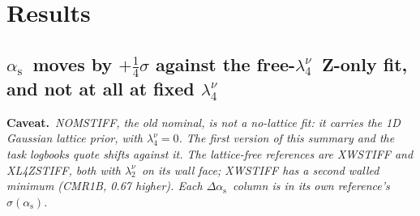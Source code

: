 \documentclass[10pt,a4paper]{article}
\newcommand\caveat[1]{{\color{sumwarn}\small\sffamily\textbf{Caveat.}}~{\small\itshape #1}}
\newcommand\alphas{\ensuremath{\alpha_\mathrm{s}}}
\newcommand\dalphas{\ensuremath{\Delta\alpha_\mathrm{s}}}
\newcommand\lnu[1]{\ensuremath{\lambda_{#1}^{\nu}}}
\newcommand\fit[1]{\textsf{#1}}
\begin{document}
\section{Results}

\subsection[alpha-s moves by +0.25 sigma against the free-lambda4 Z-only fit, and not at all at fixed lambda4]%
  {\alphas\ moves by $+\frac14\sigma$ against the free-\lnu4\ Z-only fit, and not at all at fixed \lnu4}

\caveat{\fit{NOMSTIFF}, the old nominal, is not a no-lattice fit: it carries the 1D Gaussian lattice prior, with $\lnu4=0$.
The first version of this summary and the task logbooks quote shifts against it. The lattice-free references are
\fit{XWSTIFF} and \fit{XL4ZSTIFF}, both with \lnu2\ on its wall face; \fit{XWSTIFF} has a second walled minimum
(\fit{CMR1B}, 0.67 higher). Each \dalphas\ column is in its own reference's $\sigma(\alphas)$.}
\end{document}
